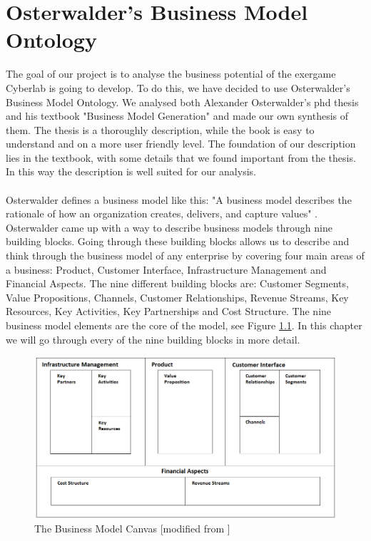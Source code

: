 \chapter{Osterwalder's Business Model Ontology}
The goal of our project is to analyse the business potential of the exergame Cyberlab is going to develop. To do this, we have decided to use Osterwalder's Business Model Ontology. We analysed both Alexander Osterwalder's phd thesis \cite{osterwalderthesis} and his textbook "Business Model Generation" \cite{osterwalder} and made our own synthesis of them. The thesis is a thoroughly description, while the book is easy to understand and on a more user friendly level. The foundation of our description lies in the textbook, with some details that we found important from the thesis. In this way the description is well suited for our analysis.\\ \\
Osterwalder defines a business model like this: "A business model describes the rationale of how an organization creates, delivers, and capture values" \cite{osterwalder}. Osterwalder came up with a way to describe business models through nine building blocks. Going through these building blocks allows us to describe and think through the business model of any enterprise by covering four main areas of a business:  Product, Customer Interface, Infrastructure Management and Financial Aspects. The nine different building blocks are: Customer Segments, Value Propositions, Channels, Customer Relationships, Revenue Streams, Key Resources, Key Activities, Key Partnerships and Cost Structure. The nine business model elements are the core of the model, see Figure \ref{fig:TheBusinessModelCanvas}. In this chapter we will go through every of the nine building blocks in more detail. \cite{osterwalder}

\begin{figure}
\label{fig:TheBusinessModelCanvas}
\begin{center}
\includegraphics[angle=90, scale=0.7]{osterwaldersbmmodified}
\caption[The Business Model Canvas]{The Business Model Canvas [modified from \cite{osterwalder}]}
\end{center}
\end{figure}

